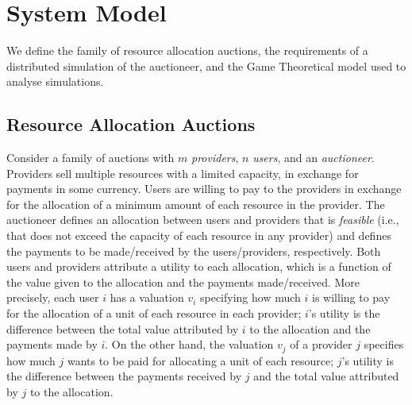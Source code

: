 \section{System Model}
\label{sec:model}
We define the family of resource allocation auctions, the requirements of 
a distributed simulation of the auctioneer, and the Game Theoretical model
used to analyse simulations.

\subsection{Resource Allocation Auctions}
Consider a family of auctions with $m$ \emph{providers},
$n$ \emph{users}, and an \emph{auctioneer}.
Providers sell multiple resources with a limited capacity,
in exchange for payments in some currency. Users are willing to pay
to the providers in exchange for the allocation of a minimum amount 
of each resource in the provider.
The auctioneer defines an allocation between users and providers
that is \emph{feasible} (i.e., that does not exceed 
the capacity of each resource in any provider)
and defines the payments to be made/received by the users/providers, respectively.
Both users and providers attribute a utility to each allocation,
which is a function of the value given to the allocation and the payments made/received.
More precisely, each user $i$ has a valuation $v_i$ 
specifying how much $i$ is willing to pay for the allocation
of a unit of each resource in each provider;
$i$'s utility is the difference between the total value
attributed by $i$ to the allocation and the payments made by $i$.
On the other hand, the valuation $v_j$ of a provider $j$
specifies how much $j$ wants to be paid for allocating a unit of each resource;
$j$'s utility is the difference between the payments received by $j$
and the total value attributed by $j$ to the allocation.

